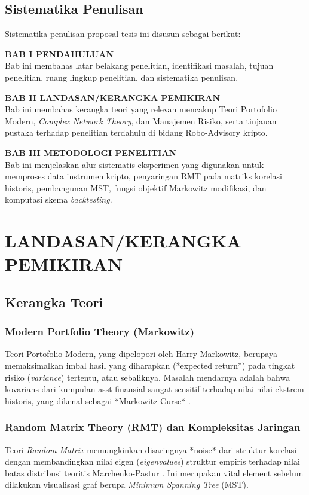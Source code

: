 \documentclass[12pt, a4paper]{report}
\begin{document}
\section{Sistematika Penulisan}

Sistematika penulisan proposal tesis ini disusun sebagai berikut:

\textbf{BAB I PENDAHULUAN} \\
Bab ini membahas latar belakang penelitian, identifikasi masalah, tujuan penelitian, ruang lingkup penelitian, dan sistematika penulisan.

\textbf{BAB II LANDASAN/KERANGKA PEMIKIRAN} \\
Bab ini membahas kerangka teori yang relevan mencakup Teori Portofolio Modern, \textit{Complex Network Theory}, dan Manajemen Risiko, serta tinjauan pustaka terhadap penelitian terdahulu di bidang Robo-Advisory kripto.

\textbf{BAB III METODOLOGI PENELITIAN} \\
Bab ini menjelaskan alur sistematis eksperimen yang digunakan untuk memproses data instrumen kripto, penyaringan RMT pada matriks korelasi historis, pembangunan MST, fungsi objektif Markowitz modifikasi, dan komputasi skema \textit{backtesting}.

\chapter{LANDASAN/KERANGKA PEMIKIRAN}

\section{Kerangka Teori}

\subsection{Modern Portfolio Theory (Markowitz)}
Teori Portofolio Modern, yang dipelopori oleh Harry Markowitz, berupaya memaksimalkan imbal hasil yang diharapkan (*expected return*) pada tingkat risiko (\textit{variance}) tertentu, atau sebaliknya. Masalah mendarnya adalah bahwa kovarians dari kumpulan asst finansial sangat sensitif terhadap nilai-nilai ekstrem historis, yang dikenal sebagai *Markowitz Curse* \cite{ref4}.

\subsection{Random Matrix Theory (RMT) dan Kompleksitas Jaringan}
Teori \textit{Random Matrix} memungkinkan disaringnya *noise* dari struktur korelasi dengan membandingkan nilai eigen (\textit{eigenvalues}) struktur empiris terhadap nilai batas distribusi teoritis Marchenko-Pastur \cite{ref3}. Ini merupakan vital element sebelum dilakukan visualisasi graf berupa \textit{Minimum Spanning Tree} (MST). 
\end{document}
